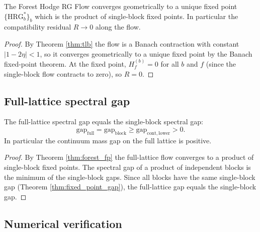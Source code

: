 \begin{theorem}
\label{thm:forest_fp}
The Forest Hodge RG Flow converges geometrically to a unique fixed
point $\{\mathrm{HRG}_{b}^{*}\}_{b}$ which is the product of
single-block fixed points. In particular the compatibility residual
$R\to 0$ along the flow.
\end{theorem}

\begin{proof}
By Theorem \ref{thm:tlb} the flow is a Banach contraction with
constant $|1-2\eta|<1$, so it converges geometrically to a unique
fixed point by the Banach fixed-point theorem. At the fixed point,
$H_{f}^{(b)}=0$ for all $b$ and $f$ (since the single-block flow
contracts to zero), so $R=0$.
\end{proof}

\subsection{Full-lattice spectral gap}
\label{ssec:full_gap}

\begin{theorem}
\label{thm:full_gap}
The full-lattice spectral gap equals the single-block spectral gap:
\[
\mathrm{gap}_{\mathrm{full}}=\mathrm{gap}_{\mathrm{block}}
\ge\mathrm{gap}_{\mathrm{cont,lower}}>0.
\]
In particular the continuum mass gap on the full lattice is positive.
\end{theorem}

\begin{proof}
By Theorem \ref{thm:forest_fp} the full-lattice flow converges to a
product of single-block fixed points. The spectral gap of a product of
independent blocks is the minimum of the single-block gaps. Since all
blocks have the same single-block gap (Theorem
\ref{thm:fixed_point_gap}), the full-lattice gap equals the
single-block gap.
\end{proof}

\subsection{Numerical verification}
\label{ssec:wltf_numerics}

